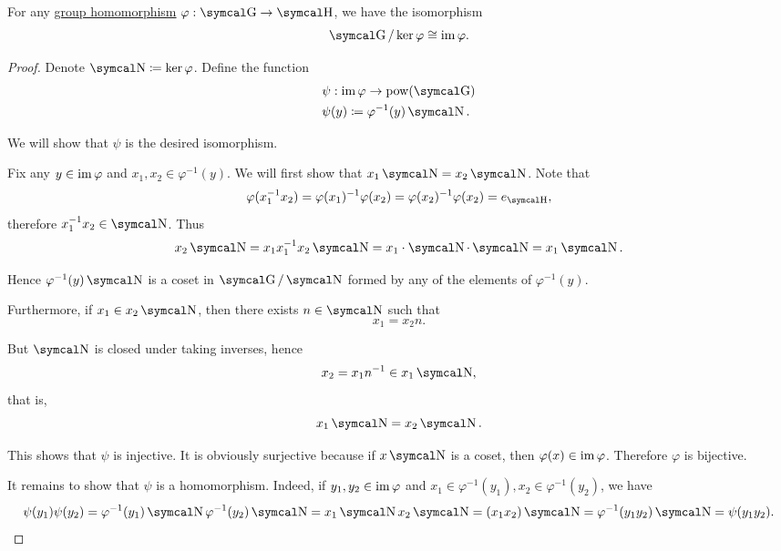 \begin{theorem}\label{thm:homomorphism_theorem_for_groups}
  For any \hyperref[def:group/homomorphism]{group homomorphism} \( \varphi: \CG \to \CH \), we have the isomorphism
  \begin{equation*}
    \CG / \ker \varphi \cong \Img \varphi.
  \end{equation*}
\end{theorem}
\begin{proof}
  Denote \( \CN \coloneqq \ker \varphi \). Define the function
  \begin{align*}
    &\psi: \Img \varphi \to \Pow(\CG) \\
    &\psi(y) \coloneqq \varphi^{-1}(y) \CN.
  \end{align*}

  We will show that \( \psi \) is the desired isomorphism.

  Fix any \( y \in \operatorname{im} \varphi \) and \( x_1, x_2 \in \varphi^{-1}(y) \). We will first show that \( x_1 \CN = x_2 \CN \). Note that
  \begin{equation*}
    \varphi(x_1^{-1} x_2)
    =
    \varphi(x_1)^{-1} \varphi(x_2)
    =
    \varphi(x_2)^{-1} \varphi(x_2)
    =
    e_{\CH},
  \end{equation*}
  therefore \( x_1^{-1} x_2 \in \CN \). Thus
  \begin{equation*}
    x_2 \CN = x_1 x_1^{-1} x_2 \CN = x_1 \cdot \CN \cdot \CN = x_1 \CN.
  \end{equation*}

  Hence \( \varphi^{-1}(y) \CN \) is a coset in \( \CG / \CN \) formed by any of the elements of \( \varphi^{-1}(y) \).

  Furthermore, if \( x_1 \in x_2 \CN \), then there exists \( n \in \CN \) such that
  \begin{equation*}
    x_1 = x_2 n.
  \end{equation*}

  But \( \CN \) is closed under taking inverses, hence
  \begin{equation*}
    x_2 = x_1 n^{-1} \in x_1 \CN,
  \end{equation*}
  that is,
  \begin{equation}
    x_1 \CN = x_2 \CN.
  \end{equation}

  This shows that \( \psi \) is injective. It is obviously surjective because if \( x \CN \) is a coset, then \( \varphi(x) \in \operatorname{im} \varphi \). Therefore \( \varphi \) is bijective.

  It remains to show that \( \psi \) is a homomorphism. Indeed, if \( y_1, y_2 \in \operatorname{im} \varphi \) and \( x_1 \in \varphi^{-1}(y_1), x_2 \in \varphi^{-1}(y_2) \), we have
  \begin{equation*}
    \psi(y_1) \psi(y_2)
    =
    \varphi^{-1}(y_1) \CN \varphi^{-1}(y_2) \CN
    =
    x_1 \CN x_2 \CN
    =
    (x_1 x_2) \CN
    =
    \varphi^{-1}(y_1 y_2) \CN
    =
    \psi(y_1 y_2).
  \end{equation*}
\end{proof}
